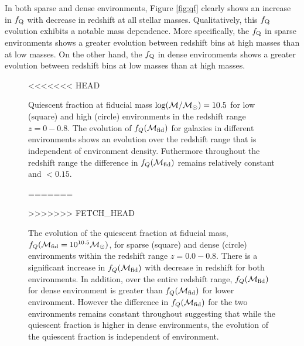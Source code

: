 \documentclass{emulateapj}
\begin{document}
In both sparse and dense environments, Figure \ref{fig:qf}
clearly shows an increase in $f_{\rm{Q}}$ with decrease in redshift at all 
stellar masses. Qualitatively, this $f_{\rm{Q}}$ evolution 
exhibits a notable mass dependence. More specifically, 
the $f_{\rm{Q}}$ in sparse environments shows a greater 
evolution between redshift bins at high masses than at low 
masses. On the other hand, the $f_{\rm{Q}}$ in dense 
environments shows a greater evolution between redshift 
bins at low masses than at high masses.

\begin{figure}
    \begin{center}
        \leavevmode
<<<<<<< HEAD
        \label{fig:qf}
        \caption{Quiescent fraction at fiducial mass $\rm{log} (\mathcal{M}/\mathcal{M}_{\odot}) = 10.5$ for 
low (square) and high (circle) environments in the redshift range $z = 0 - 0.8$. The evolution of 
$f_{Q}(\mathcal{M}_{\rm{fid}})$ for galaxies in different environments shows an evolution over the redshift
range that is independent of environment density. Futhermore throughout the redshift range the difference in 
$f_{Q}(\mathcal{M}_{\rm{fid}})$ remains relatively constant and $ < 0.15$.}
=======
        \caption{The evolution of the quiescent fraction at fiducial mass, $f_{Q}(\mathcal{M}_{\rm{fid}} = 10^{10.5} \mathcal{M}_\odot)$, for sparse (square) and dense (circle) environments within the redshift range $z = 0.0 - 0.8$.  There is a significant increase in $f_{Q}(\mathcal{M}_{\rm{fid}})$ with decrease in redshift for both environments. In addition, over the entire redshift range, $f_{Q}(\mathcal{M}_{\rm{fid}})$ for dense environment is greater than $f_{Q}(\mathcal{M}_{\rm{fid}})$ for lower environment. However the difference in $f_{Q}(\mathcal{M}_{\rm{fid}})$ for the two environments remains constant throughout suggesting that while the quiescent fraction is higher in dense environments, the evolution of the quiescent fraction is independent of environment.}         \label{fig:qffit}
>>>>>>> FETCH_HEAD
    \end{center}
\end{figure}
\end{document}
